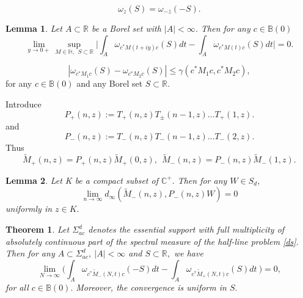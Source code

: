 \documentclass[10pt,a4paper]{amsart}
\newtheorem{lemma}{Lemma}
\newtheorem{theorem}{Theorem}
\newcommand{\C}{\mathbb{C}}
\newcommand{\R}{\mathbb{R}}
\begin{document}
\begin{equation} \label{hmp}
\omega_z(S) = \omega_{-\overline{z}}(-S). 
\end{equation} 

\begin{lemma} \label{lemma 4.6} Let $A \subset \R$ be a Borel set with $|A| < \infty $. Then  for any $c\in \mathbb B(0)$ 
$$ \lim_{y\rightarrow 0+} \sup_{M\in \mathbb H, \ \ S \subset \R} \Big| \int_A \omega_{c^*M(t+iy)c}(S) dt  - \int_A \omega_{c^*M(t)c}(S) dt \Big| = 0 .$$\end{lemma}

 \begin{equation} \label{eq 4.11}
 |\omega_{c^* M_1 c}(S)-\omega_{c^*M_2c}(S)|\leq \gamma(c^*M_1c,c^*M_2 c),
 \end{equation} for any $c \in \mathbb B(0)$ and any Borel set $S\subset\R.$ 

 Introduce $$P_{+}(n,z):= T_{+}(n,z)T_{\pm}(n-1,z) \dots T_{+}(1,z).$$ and $$ P_-(n,z) := T_{-}(n,z)T_{-}(n-1,z) \dots T_{-}(2,z).$$ Thus  \begin{equation} \label{eq 4.14}  \tilde  M_+ (n,z) =P_{+}(n,z) \tilde M_+(0,z), \    \ \tilde M_- (n,z) =P_{-}(n,z) \tilde M_-(1,z)    
 .\end{equation}

\begin{lemma} \label{lemma 4.11 } Let K be a compact subset of $\C^+.$ Then for any $W\in S_d,$
	 $$ \lim_{n\rightarrow \infty}	d_{\infty}(\tilde M_-(n, z),  P_-(n, z)W) = 0  $$  uniformly in $z\in K .$\end{lemma}

\begin{theorem} \label{theorem 4.8}  Let $\Sigma_{ac}^d$ denotes the essential support with full multiplicity of absolutely continuous part of the spectral measure of the half-line problem \eqref{ds}. Then for any $A \subset \Sigma_{ac}^d, \ |A| < \infty $ and $S \subset \R,$ we have 
\begin{equation*}
\lim_{N\rightarrow \infty}\Big ( \int_A \omega_{c^* \tilde M_-(N,t)c} (-S) dt -\int_A \omega_{c^* \tilde M_+(N,t)c}(S) dt\ \Big ) = 0,
\end{equation*} 
for all $c\in \mathbb B(0).$ Moreover, the convergence is uniform in $S .$\end{theorem}
\end{document}
